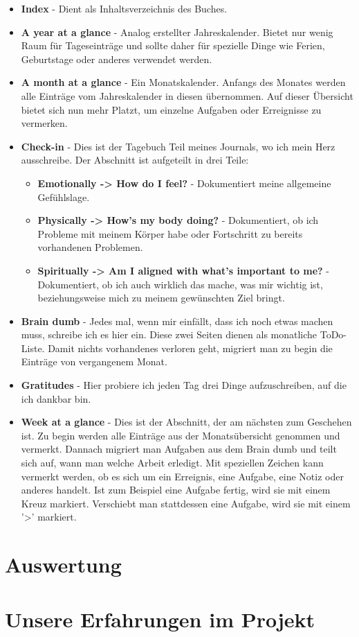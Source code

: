 \begin{itemize}
  \item \textbf{Index} - Dient als Inhaltsverzeichnis des Buches.
  \item \textbf{A year at a glance} - Analog erstellter Jahreskalender. Bietet nur wenig Raum für Tageseinträge und sollte daher für spezielle Dinge wie Ferien, Geburtstage oder anderes verwendet werden.
  \item \textbf{A month at a glance} - Ein Monatskalender. Anfangs des Monates werden alle Einträge vom Jahreskalender in diesen übernommen. Auf dieser Übersicht bietet sich nun mehr Platzt, um einzelne Aufgaben oder Erreignisse zu vermerken.
  \item \textbf{Check-in} - Dies ist der Tagebuch Teil meines Journals, wo ich mein Herz ausschreibe. Der Abschnitt ist aufgeteilt in drei Teile:
  \begin{itemize}
    \item \textbf{Emotionally -> How do I feel?} - Dokumentiert meine allgemeine Gefühlslage.
    \item \textbf{Physically -> How's my body doing?} - Dokumentiert, ob ich Probleme mit meinem Körper habe oder Fortschritt zu bereits vorhandenen Problemen.
    \item \textbf{Spiritually -> Am I aligned with what's important to me?} - Dokumentiert, ob ich auch wirklich das mache, was mir wichtig ist, beziehungsweise mich zu meinem gewünschten Ziel bringt.
  \end{itemize}
  \item \textbf{Brain dumb} - Jedes mal, wenn mir einfällt, dass ich noch etwas machen muss, schreibe ich es hier ein. Diese zwei Seiten dienen als monatliche ToDo-Liste. Damit nichts vorhandenes verloren geht, migriert man zu begin die Einträge von vergangenem Monat.
  \item \textbf{Gratitudes} - Hier probiere ich jeden Tag drei Dinge aufzuschreiben, auf die ich dankbar bin.
  \item \textbf{Week at a glance} - Dies ist der Abschnitt, der am nächsten zum Geschehen ist. Zu begin werden alle Einträge aus der Monatsübersicht genommen und vermerkt. Dannach migriert man Aufgaben aus dem Brain dumb und teilt sich auf, wann man welche Arbeit erledigt. Mit speziellen Zeichen kann vermerkt werden, ob es sich um ein Erreignis, eine Aufgabe, eine Notiz oder anderes handelt. Ist zum Beispiel eine Aufgabe fertig, wird sie mit einem Kreuz markiert. Verschiebt man stattdessen eine Aufgabe, wird sie mit einem '>' markiert.
\end{itemize}
\section{Auswertung}
\section{Unsere Erfahrungen im Projekt}